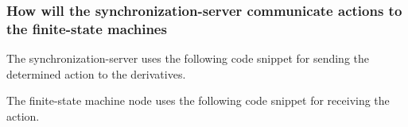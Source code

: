\hypertarget{how-will-the-synchronization-server-communicate-actions-to-the-finite-state-machines}{%
\subsubsection{How will the synchronization-server communicate actions
to the finite-state
machines}\label{how-will-the-synchronization-server-communicate-actions-to-the-finite-state-machines}}

The synchronization-server uses the following code snippet for sending
the determined action to the derivatives.

\begin{Shaded}
\begin{Highlighting}[]
    \NormalTok{ derivatives[DERIVATIVES),}
\NormalTok{\{}
    \NormalTok{;}

\NormalTok{    \{}
\NormalTok{        \{}
\NormalTok{        \}}
\NormalTok{    \}}
\NormalTok{\}}

\NormalTok{\{}
\NormalTok{\}}
\end{Highlighting}
\end{Shaded}

The finite-state machine node uses the following code snippet for
receiving the action.

\begin{Shaded}
\begin{Highlighting}[]
\NormalTok{\{}

\NormalTok{\}}
\end{Highlighting}
\end{Shaded}

